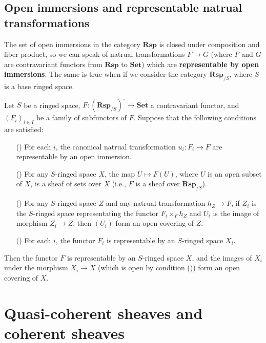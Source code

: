 \subsection{Open immersions and representable natrual transformations}
The set of open immersions in the category $\mathbf{Rsp}$ is closed under composition and fiber product, so we can speak of natrual transformations $F\to G$ (where $F$ and $G$ are contravariant functors from $\mathbf{Rsp}$ to $\mathbf{Set}$) which are \textbf{representable by open immersions}. The same is true when if we consider the category $\mathbf{Rsp}_{/S}$, where $S$ is a base ringed space.
\begin{proposition}\label{ringed space representable functor via subfunctor}
Let $S$ be a ringed space, $F:(\mathbf{Rsp}_{/S})^{\circ}\to\mathbf{Set}$ a contravariant functor, and $(F_i)_{i\in I}$ be a family of subfunctors of $F$. Suppose that the following conditions are satisfied:
\begin{itemize}
\item[(\rmnum{1})] For each $i$, the canonical natrual transformation $u_i:F_i\to F$ are representable by an open immersion.
\item[(\rmnum{2})] For any $S$-ringed space $X$, the map $U\mapsto F(U)$, where $U$ is an open subset of $X$, is a sheaf of sets over $X$ (i.e., $F$ is a sheaf over $\mathbf{Rsp}_{/S}$).
\item[(\rmnum{3})] For any $S$-ringed space $Z$ and any natrual transformation $h_Z\to F$, if $Z_i$ is the $S$-ringed space representating the functor $F_i\times_Fh_Z$ and $U_i$ is the image of morphism $Z_i\to Z$, then $(U_i)$ form an open covering of $Z$. 
\item[(\rmnum{4})] For each $i$, the functor $F_i$ is representable by an $S$-ringed space $X_i$.
\end{itemize}
Then the functor $F$ is representable by an $S$-ringed space $X$, and the images of $X_i$ under the morphism $X_i\to X$ (which is open by condition ()) form an open covering of $X$.
\end{proposition}
\section{Quasi-coherent sheaves and coherent sheaves}

